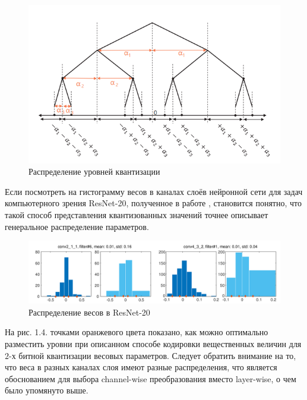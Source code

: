 \begin{figure}[H]
    \begin{center}
        \includegraphics[scale=0.55]{tex/inc/img/lvls.jpg}
        \caption{Распределение уровней квантизации}
    \end{center}
\end{figure}

Если посмотреть на гистограмму весов в каналах слоёв нейронной сети для задач компьютерного зрения ResNet-20, полученное в работе \cite{lq}, становится понятно, что такой способ представления квантизованных значений точнее описывает генеральное распределение параметров.

\begin{figure}[H]
    \begin{center}
        \includegraphics[scale=0.36]{tex/inc/img/distrib.jpg}
        \caption{Распределение весов в ResNet-20}
    \end{center}
\end{figure}


На рис. 1.4. точками оранжевого цвета показано, как можно оптимально разместить уровни при описанном способе кодировки вещественных величин для $2$-х битной квантизации весовых параметров. Следует обратить внимание на то, что веса в разных каналах слоя имеют разные распределения, что является обоснованием для выбора channel-wise преобразования вместо layer-wise, о чем было упомянуто выше.

